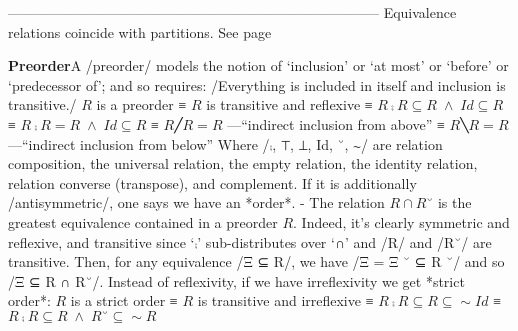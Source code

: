 \documentclass[11pt]{article}
\begin{document}
-------------------------------------------------------------------------------- Equivalence relations coincide with partitions. See page \pageref{org-special-block-extras-glossary-declaration-site-Equivalence}

\vspace{1em}\textbf{Preorder}\quad\label{org-special-block-extras-glossary-Preorder}A /preorder/ models the notion of ‘inclusion’ or ‘at most’ or ‘before’ or ‘predecessor of’; and so requires: /Everything is included in itself and inclusion is transitive./   \quad $R$ is a preorder ≡ $R$ is transitive and reflexive ≡ $R ⨾ R ⊆ R \;∧\; Id ⊆ R$ ≡ $R ⨾ R = R \;∧\; Id ⊆ R$ ≡ $R ╱ R = R$ \quad ---“indirect inclusion from above” ≡ $R ╲ R = R$ \quad ---“indirect inclusion from below”  Where /⨾, ⊤, ⊥, Id, ˘, ∼/ are relation composition, the universal relation, the empty relation, the identity relation, relation converse (transpose), and complement.  If it is additionally /antisymmetric/, one says we have an *order*. - The relation $R ∩ R˘$ is the greatest equivalence contained in a preorder $R$.   \quad Indeed, it's clearly symmetric and reflexive, and transitive since ‘⨾’  \quad sub-distributes over ‘∩’ and /R/ and /R˘/ are transitive. Then, for any  \quad equivalence /Ξ ⊆ R/, we have /Ξ = Ξ ˘ ⊆ R ˘/ and so /Ξ ⊆ R ∩ R˘/.  Instead of reflexivity, if we have irreflexivity we get *strict order*:  \quad $R$ is a strict order ≡ $R$ is transitive and irreflexive ≡ $R ⨾ R ⊆ R ⊆ ∼Id$ ≡ $R ⨾ R ⊆ R \;∧\; R˘ ⊆ ∼ R$ 
\end{document}
